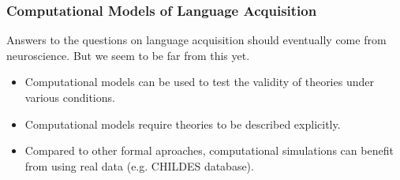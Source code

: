 \begin{frame}
\frametitle{Computational Models of Language Acquisition}

Answers to the questions on language acquisition should eventually
come from neuroscience. But we seem to be far from this yet.

\begin{itemize}
\item Computational models can be used to test the validity of
      theories under various conditions.
\item Computational models require theories to be described explicitly.
\item Compared to other formal aproaches, computational simulations
      can benefit from using real data (e.g. CHILDES database).
\end{itemize}

\end{frame}
